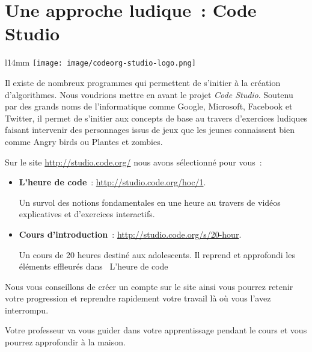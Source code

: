 \chapter{Une approche ludique~: Code Studio}

	\begin{wrapfigure}{l}{14mm}
	\vskip-4mm
	\texttt{[image: image/codeorg-studio-logo.png]}
	\vskip-2mm
	\end{wrapfigure}
	
	Il existe de nombreux programmes 
	qui permettent de s’initier à la création d’algorithmes.
	Nous voudrions mettre en avant le projet \emph{Code Studio}.
	Soutenu par des grands noms de l’informatique 
	comme \textsf{Google}, \textsf{Microsoft}, 
	\textsf{Facebook} et \textsf{Twitter},
	il permet de s’initier aux concepts de base
	au travers d’exercices ludiques faisant intervenir 
	des personnages issus de jeux que les jeunes connaissent bien 
	comme \textsf{Angry birds} ou \textsf{Plantes et zombies}.
	
	Sur le site \url{http://studio.code.org/} 
	nous avons sélectionné pour vous~:

	\begin{itemize}
	\item
		\textbf{L’heure de code}~: 
		\url{http://studio.code.org/hoc/1}.
		
		Un survol des notions fondamentales en une heure
		au travers de vidéos explicatives et d’exercices interactifs.
	\item
		\textbf{Cours d’introduction}~: 
		\url{http://studio.code.org/s/20-hour}.
		
		Un cours de 20 heures destiné aux adolescents.
		Il reprend et approfondi les éléments effleurés dans
		\og\ L’heure de code\fg	
	\end{itemize}
	
	Nous vous conseillons de créer un compte sur le site
	ainsi vous pourrez retenir votre progression
	et reprendre rapidement votre travail là où vous l’avez
	interrompu.
	
	Votre professeur va vous guider dans votre apprentissage
	pendant le cours et vous pourrez approfondir à la maison.
	
